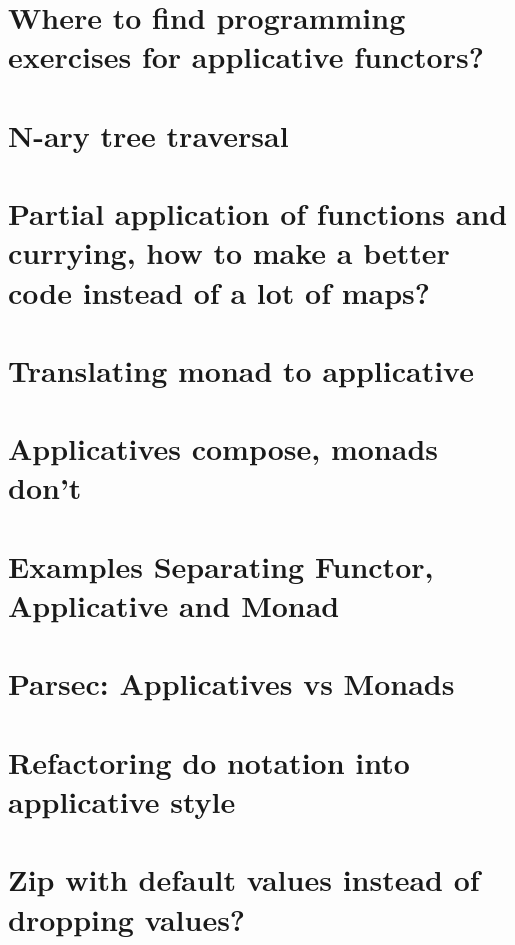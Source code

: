 \documentclass{book}%
\begin{document}
\section{Where to find programming exercises for applicative functors?}


\section{N-ary tree traversal}


\section{Partial application of functions and currying, how to make a better code instead of a lot of maps?}


\section{Translating monad to applicative}


\section{Applicatives compose, monads don't}


\section{Examples Separating Functor, Applicative and Monad}


\section{Parsec: Applicatives vs Monads}


\section{Refactoring do notation into applicative style}


\section{Zip with default values instead of dropping values?}

\end{document}
